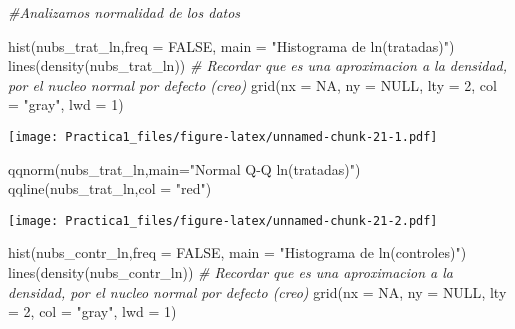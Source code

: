 \documentclass[
]{article}
\newenvironment{Shaded}{\begin{snugshade}}{\end{snugshade}}
\newcommand{\AttributeTok}[1]{\textcolor[rgb]{0.77,0.63,0.00}{#1}}
\newcommand{\CommentTok}[1]{\textcolor[rgb]{0.56,0.35,0.01}{\textit{#1}}}
\newcommand{\ConstantTok}[1]{\textcolor[rgb]{0.00,0.00,0.00}{#1}}
\newcommand{\DecValTok}[1]{\textcolor[rgb]{0.00,0.00,0.81}{#1}}
\newcommand{\FunctionTok}[1]{\textcolor[rgb]{0.00,0.00,0.00}{#1}}
\newcommand{\NormalTok}[1]{#1}
\newcommand{\StringTok}[1]{\textcolor[rgb]{0.31,0.60,0.02}{#1}}
\begin{document}
\begin{Shaded}
\begin{Highlighting}[]
\CommentTok{\#Analizamos normalidad de los datos }

\FunctionTok{hist}\NormalTok{(nubs\_trat\_ln,}\AttributeTok{freq =} \ConstantTok{FALSE}\NormalTok{, }\AttributeTok{main =} \StringTok{"Histograma de ln(tratadas)"}\NormalTok{)}
\FunctionTok{lines}\NormalTok{(}\FunctionTok{density}\NormalTok{(nubs\_trat\_ln)) }\CommentTok{\# Recordar que es una aproximacion a la densidad, por el nucleo normal por defecto (creo)}
\FunctionTok{grid}\NormalTok{(}\AttributeTok{nx =} \ConstantTok{NA}\NormalTok{, }\AttributeTok{ny =} \ConstantTok{NULL}\NormalTok{, }\AttributeTok{lty =} \DecValTok{2}\NormalTok{, }\AttributeTok{col =} \StringTok{"gray"}\NormalTok{, }\AttributeTok{lwd =} \DecValTok{1}\NormalTok{)}
\end{Highlighting}
\end{Shaded}

\texttt{[image: Practica1\_files/figure-latex/unnamed-chunk-21-1.pdf]}

\begin{Shaded}
\begin{Highlighting}[]
\FunctionTok{qqnorm}\NormalTok{(nubs\_trat\_ln,}\AttributeTok{main=}\StringTok{"Normal Q{-}Q ln(tratadas)"}\NormalTok{)}
\FunctionTok{qqline}\NormalTok{(nubs\_trat\_ln,}\AttributeTok{col =} \StringTok{"red"}\NormalTok{)}
\end{Highlighting}
\end{Shaded}

\texttt{[image: Practica1\_files/figure-latex/unnamed-chunk-21-2.pdf]}

\begin{Shaded}
\begin{Highlighting}[]
\FunctionTok{hist}\NormalTok{(nubs\_contr\_ln,}\AttributeTok{freq =} \ConstantTok{FALSE}\NormalTok{, }\AttributeTok{main =} \StringTok{"Histograma de ln(controles)"}\NormalTok{)}
\FunctionTok{lines}\NormalTok{(}\FunctionTok{density}\NormalTok{(nubs\_contr\_ln)) }\CommentTok{\# Recordar que es una aproximacion a la densidad, por el nucleo normal por defecto (creo)}
\FunctionTok{grid}\NormalTok{(}\AttributeTok{nx =} \ConstantTok{NA}\NormalTok{, }\AttributeTok{ny =} \ConstantTok{NULL}\NormalTok{, }\AttributeTok{lty =} \DecValTok{2}\NormalTok{, }\AttributeTok{col =} \StringTok{"gray"}\NormalTok{, }\AttributeTok{lwd =} \DecValTok{1}\NormalTok{)}
\end{Highlighting}
\end{Shaded}
\end{document}
